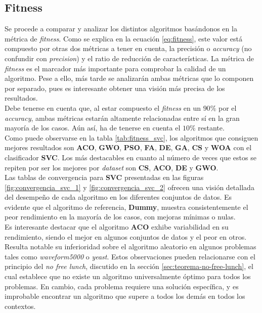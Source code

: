 \subsection{Fitness}
Se procede a comparar y analizar los distintos algoritmos basándonos en la métrica de \textit{fitness}. Como se explica en la ecuación \ref{eq:fitness}, este valor está compuesto por otras dos métricas a tener en cuenta, la precisión o \textit{accuracy} (no confundir con \textit{precision}) y el ratio de reducción de características. La métrica de \textit{fitness} es el marcador más importante para comprobar la calidad de un algoritmo. Pese a ello, más tarde se analizarán ambas métricas que lo componen por separado, pues es interesante obtener una visión más precisa de los resultados.\\[6pt]
Debe tenerse en cuenta que, al estar compuesto el \textit{fitness} en un $90\%$ por el \textit{accuracy}, ambas métricas estarán altamente relacionadas entre sí en la gran mayoría de los casos. Aún así, ha de tenerse en cuenta el $10\%$ restante.\\[6pt]
Como puede observarse en la tabla \ref{tab:fitness_svc}, los algoritmos que consiguen mejores resultados son \textbf{ACO}, \textbf{GWO}, \textbf{PSO}, \textbf{FA}, \textbf{DE}, \textbf{GA}, \textbf{CS} y \textbf{WOA} con el clasificador \textbf{SVC}. Los más destacables en cuanto al número de veces que estos se repiten por ser los mejores por \textit{dataset} son \textbf{CS}, \textbf{ACO}, \textbf{DE} y \textbf{GWO}.\\[6pt]

Las tablas de convergencia para \textbf{SVC} presentadas en las figuras \ref{fig:convergencia_svc_1} y \ref{fig:convergencia_svc_2} ofrecen una visión detallada del desempeño de cada algoritmo en los diferentes conjuntos de datos. Es evidente que el algoritmo de referencia, \textbf{Dummy}, muestra consistentemente el peor rendimiento en la mayoría de los casos, con mejoras mínimas o nulas.\\[6pt]
Es interesante destacar que el algoritmo \textbf{ACO} exhibe variabilidad en su rendimiento, siendo el mejor en algunos conjuntos de datos y el peor en otros. Resulta notable su inferioridad sobre el algoritmo aleatorio en algunos problemas tales como \textit{waveform5000} o \textit{yeast}. Estos observaciones pueden relacionarse con el principio del \textit{no free lunch}, discutido en la sección \ref{sec:teorema-no-free-lunch}, el cual establece que no existe un algoritmo universalmente óptimo para todos los problemas. En cambio, cada problema requiere una solución específica, y es improbable encontrar un algoritmo que supere a todos los demás en todos los contextos.

